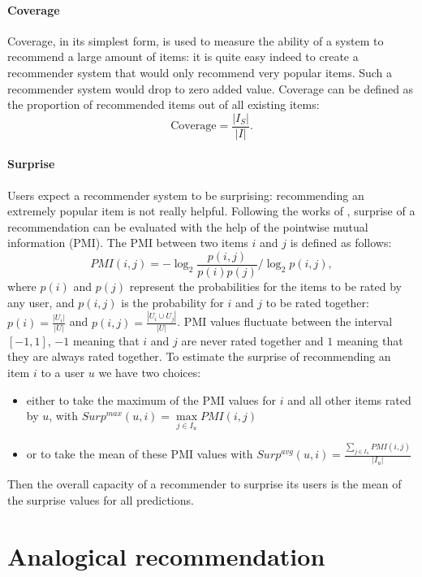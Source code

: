 \paragraph{Coverage\\}
Coverage, in its simplest form, is used to measure the ability of a system to
recommend a large amount of items: it is quite easy indeed to create a
recommender system that would only recommend very popular items. Such a
recommender system would drop to zero added value. Coverage can be defined as the
proportion of recommended items out of all existing items:
$$\text{Coverage} = \frac{|I_{S}|}{|I|}.$$



\paragraph{Surprise\\}
Users expect a recommender system to be surprising: recommending an extremely
popular item is not really helpful. Following the works of
\cite{KamBriRecSys2014}, surprise of a recommendation can be evaluated with the
help of the pointwise mutual
information (PMI). The PMI between two items $i$ and $j$ is defined as follows:
$$PMI(i, j) = -\log_2 \frac{p(i, j)}{p(i)p(j)} / \log_2 p(i, j),$$
where $p(i)$ and $p(j)$  represent the probabilities for the items to be rated
by any user, and $p(i, j)$ is the probability for $i$ and $j$ to be rated
together: $p(i) = \tfrac{|U_i|}{|U|}$ and $p(i, j) = \tfrac{|U_i \cup
U_j|}{|U|}$. PMI values fluctuate between the interval $[-1, 1]$, $-1$ meaning
that $i$ and $j$ are never rated together and $1$ meaning that they are always
rated together. To estimate the surprise of recommending an item $i$ to a user
$u$ we have two choices:
\begin{itemize}
\item either to take the maximum of the PMI values for $i$ and all
other items rated by $u$, with $Surp^{max}(u, i) = \max\limits_{j\in I_u} PMI(i, j)$
\item
 or to take the mean of these PMI values with $Surp^{avg}(u, i) =
\frac{\sum_{j \in I_u} PMI(i, j)}{|I_u|}$
\end{itemize}
Then the overall capacity of a recommender to surprise its users is the mean of the
surprise values for all predictions.

\section{Analogical recommendation}
\label{sec:analogical_recommendation}

